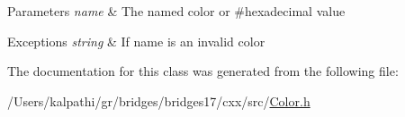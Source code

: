 \begin{DoxyParams}{Parameters}
{\em name} & The named color or \#hexadecimal value \\
\hline
\end{DoxyParams}

\begin{DoxyExceptions}{Exceptions}
{\em string} & If name is an invalid color \\
\hline
\end{DoxyExceptions}


The documentation for this class was generated from the following file\+:\begin{DoxyCompactItemize}
\item 
/\+Users/kalpathi/gr/bridges/bridges17/cxx/src/\hyperlink{_color_8h}{Color.\+h}\end{DoxyCompactItemize}
